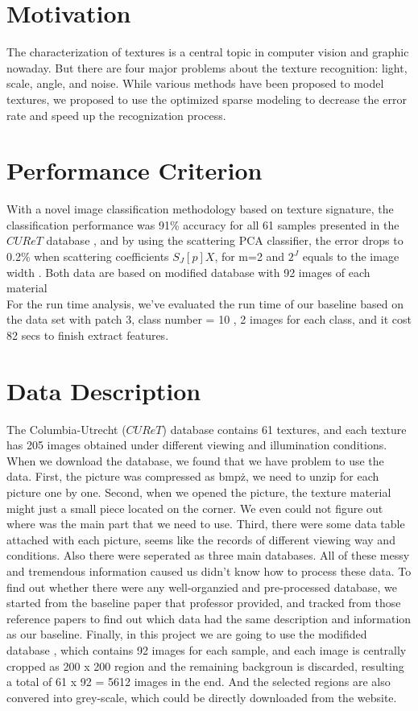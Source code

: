 \documentclass[final,leqno,onefignum,onetabnum]{siamltexmm}
\begin{document}
\section{Motivation}
The characterization of textures is a central topic in computer vision and graphic nowaday. But there are four major problems about the texture recognition: light,
scale, angle, and noise. While various methods have been proposed to model textures, we proposed to use the optimized sparse modeling to decrease the error rate and speed up the recognization process.


\section{Performance Criterion}
With a novel image classification methodology based on texture signature, the classification performance was 91\% accuracy for all 61 samples presented in the \(CUReT\) database \cite{dataref}, and by using the scattering PCA classifier, the error drops to 0.2\% when scattering coefficients $S_J[p]X$, for m=2 and $ 2^{J} $ equals to the image width \cite{baseline} . Both data are based on modified database with 92 images of each material \cite{dataset_mod}
\\
For the run time analysis, we've evaluated the run time of our baseline based on the data set with patch 3, class number = 10 , 2 images for each class, and it cost 82 secs to finish extract features.



\section{Data Description}
The Columbia-Utrecht (\(CUReT\)) \cite{dataset_link}\cite{dataset} database contains 61 textures, and each texture has 205 images obtained under different viewing and illumination conditions. When we download the database, we found that we have problem to use the data. First, the picture was compressed as bmp\.z, we need to unzip for each picture one by one. Second, when we opened the picture, the texture material might just a small piece located on the corner. We even could not figure out where was the main part that we need to use. Third, there were some data table attached with each picture, seems like the records of different viewing way and conditions. Also there were seperated as three main databases. All of these messy and tremendous information caused us didn't know how to process these data. To find out whether there were any well-organzied and pre-processed database, we started from the baseline paper \cite{baseline} that professor provided, and tracked from those reference papers to find out which data had the same description and information as our baseline. Finally, in this project we are going to use the modifided database \cite{dataref_mod}, which contains 92 images for each sample, and each image is centrally cropped as 200 x 200 region and the remaining backgroun is discarded, resulting a total of 61 x 92 = 5612 images in the end. And the selected regions are also convered into grey-scale, which could be directly downloaded from the website\cite{dataset_mod}. 
\end{document}
